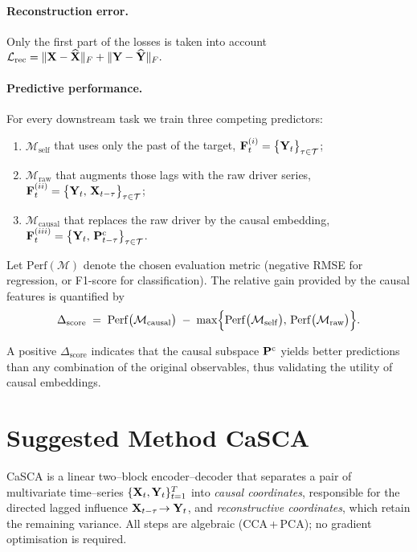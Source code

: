 \documentclass[14pt]{extarticle}
\begin{document}
	\paragraph{Reconstruction error.}
	Only the first part of the losses is taken into account
	\(
	\mathcal L_{\mathrm{rec}}
	=
	\Vert\mathbf{X}-\widehat{\mathbf{X}}\Vert_F
	+
	\Vert\mathbf{Y}-\widehat{\mathbf{Y}}\Vert_F .
	\)
	
	\paragraph{Predictive performance.}
	For every downstream task we train three competing predictors:
	
	\begin{enumerate}[label=(\roman*),nosep,leftmargin=1.4cm]
		\item \( \mathcal{M}_{\mathrm{self}} \) that uses only the past of the target,  
		\( \mathbf{F}^{(i)}_t = \bigl\{ \mathbf{Y}_{t}\bigr\}_{\tau\in\mathcal{T}} \);
		\item \( \mathcal{M}_{\mathrm{raw}} \) that augments those lags with the raw driver series,  
		\( \mathbf{F}^{(ii)}_t = \bigl\{ \mathbf{Y}_{t},\,\mathbf{X}_{t-\tau}\bigr\}_{\tau\in\mathcal{T}} \);
		\item \( \mathcal{M}_{\mathrm{causal}} \) that replaces the raw driver by the causal embedding,  
		\( \mathbf{F}^{(iii)}_t = \bigl\{ \mathbf{Y}_{t},\,\mathbf{P}_{t-\tau}^{\mathrm c}\bigr\}_{\tau\in\mathcal{T}} \).
	\end{enumerate}
	
	Let \(\mathrm{Perf}(\mathcal{M})\) denote the chosen evaluation metric  
	(negative RMSE for regression, or F1-score for classification).  
	The relative gain provided by the causal features is quantified by
	\[
	\Delta_{\text{score}}
	\;=\;
	\mathrm{Perf}\bigl(\mathcal{M}_{\mathrm{causal}}\bigr)
	\;-\;
	\max\Bigl\{
	\mathrm{Perf}\bigl(\mathcal{M}_{\mathrm{self}}\bigr),\,
	\mathrm{Perf}\bigl(\mathcal{M}_{\mathrm{raw}}\bigr)
	\Bigr\}.
	\]
	
	A positive \(\Delta_{\text{score}}\) indicates that the causal subspace
	\(\mathbf{P}^{\mathrm c}\) yields better predictions than any combination
	of the original observables, thus validating the utility of causal embeddings.
	
	
	\section{Suggested Method CaSCA} \label{sec:purecca}
	
	CaSCA is a linear two–block encoder–decoder that separates a pair of
	multivariate time–series \(\{\mathbf{X}_t ,\mathbf{Y}_t\}_{t=1}^{T}\) into
	\emph{causal coordinates}, responsible for the directed lagged influence
	\(\mathbf{X}_{t-\tau}\!\to\mathbf{Y}_t\), and \emph{reconstructive coordinates}, which
	retain the remaining variance.  
	All steps are algebraic (CCA\,+\,PCA); no gradient optimisation is
	required.
	
\end{document}
